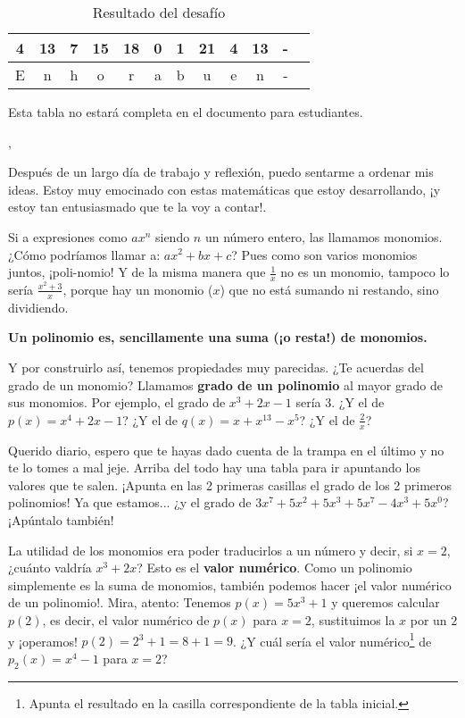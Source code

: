 \documentclass{article}
\DeclareRobustCommand{\augiefamily}{%
  \fontfamily{augie}\fontseries{m}\fontshape{n}\selectfont}
\begin{document}
\begin{table}
\centering
\caption{Resultado del desafío}
\begin{tabular}{|c|c|c|c|c|c|c|c|c|c|c|c|}
\hline
4 & 13 & 7 & 15 & 18 & 0 & 1 & 21 & 4 & 13 & -\\\hline
E & n  & h & o & r & a & b & u & e & n & -\\\hline
\end{tabular}

\small{Esta tabla no estará completa en el documento para estudiantes.}
\end{table}

\augiefamily{Querido diario},
\Fontauri

Después de un largo día de trabajo y reflexión, puedo sentarme a ordenar mis ideas.
%
Estoy muy emocinado con estas matemáticas que estoy desarrollando, ¡y estoy tan entusiasmado que te la voy a contar!.


Si a expresiones como $ax^n$ siendo $n$ un número entero, las llamamos monomios. ¿Cómo podríamos llamar a: $ax^2+bx+c$? 
%
Pues como son varios monomios juntos, ¡poli-nomio!
%
Y de la misma manera que $\frac{1}{x}$ no es un monomio, tampoco lo sería $\frac{x^2+3}{x}$, porque hay un monomio ($x$) que no está sumando ni restando, sino dividiendo.

\textbf{Un polinomio es, sencillamente una suma (¡o resta!) de monomios.}

Y por construirlo así, tenemos propiedades muy parecidas. ¿Te acuerdas del grado de un monomio?
%
Llamamos \textbf{grado de un polinomio} al mayor grado de sus monomios. Por ejemplo, el grado de $x^3+2x-1$ sería $3$.
%
¿Y el de $p(x) = x^4+2x-1$? ¿Y el de $q(x) = x+x^{13}-x^5$? ¿Y el de $\frac{2}{x}$?

Querido diario, espero que te hayas dado cuenta de la trampa en el último y no te lo tomes a mal jeje.
%
Arriba del todo hay una tabla para ir apuntando los valores que te salen. ¡Apunta en las 2 primeras casillas el grado de los 2 primeros polinomios!
%
Ya que estamos... ¿y el grado de $3x^7+5x^2+5x^3+5x^7-4x^3+5x^0$? ¡Apúntalo también!

La utilidad de los monomios era poder traducirlos a un número y decir, si $x=2$, ¿cuánto valdría $x^3+2x$? 
%
Esto es el \textbf{valor numérico}.
%
Como un polinomio simplemente es la suma de monomios, también podemos hacer ¡el valor numérico de un polinomio!. 
%
Mira, atento:
%
Tenemos $p(x) = 5x^3+1$ y queremos calcular $p(2)$, es decir, el valor numérico de $p(x)$ para $x=2$, sustituimos la $x$ por un $2$ y ¡operamos! $p(2) = 2^3+1=8+1=9$.
%
¿Y cuál sería el valor numérico\footnote{Apunta el resultado en la casilla correspondiente de la tabla inicial.} de $p_2(x) = x^4-1$ para $x=2$? 
\end{document}
